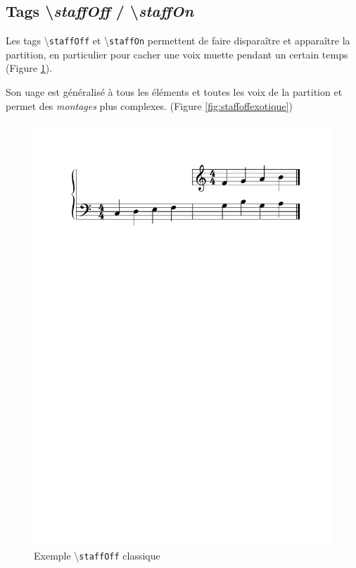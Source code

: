 \documentclass{article}
\newenvironment{gmncode}	{\vspace{-2mm}\small\verbatim}{\endverbatim\vspace{-2mm}}
\newcommand{\code}[1]		{{\small \texttt{#1}}}
\newcommand{\guidotag}[1]	{\textbackslash\code{#1}}
\begin{document}
\subsection{Tags \textbackslash{}\emph{staffOff} / \textbackslash{}\emph{staffOn}}\label{subsec:staffoff}

\vspace{2mm}
\begin{gmncode}
[ ... \staffOff ... \staffOn ... ]
\end{gmncode}



Les tags \guidotag{staffOff} et \guidotag{staffOn} permettent de faire disparaître et apparaître la partition, en particulier pour cacher une voix muette pendant un certain temps (Figure \ref{fig:staffoffsimple}).

Son uage est généralisé à tous les éléments et toutes les voix de la partition et permet des \emph{montages} plus complexes. (Figure \ref{fig:staffoffexotique})

\begin{figure}[h]
\centering
\includegraphics[width=\columnwidth]{img/staffoff.pdf}
\caption{ Exemple \guidotag{staffOff} classique}
\label{fig:staffoffsimple}
\end{figure}
\end{document}
